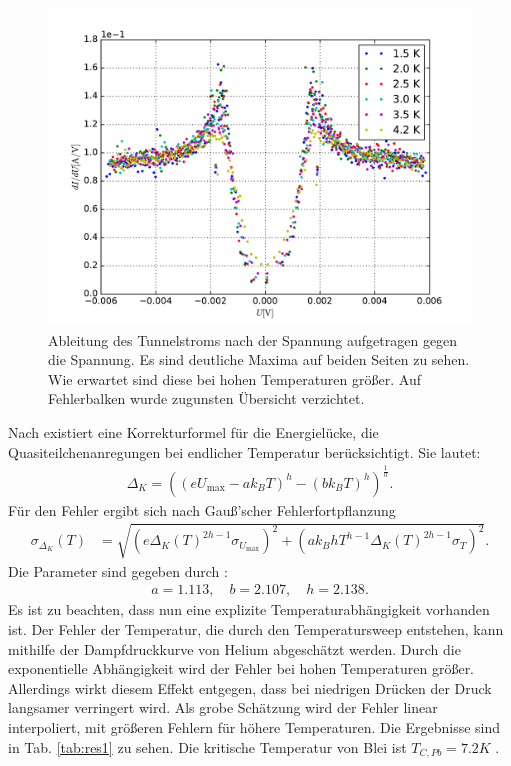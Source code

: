 \documentclass[twoside,        %
               BCOR12mm,       %
               english,ngerman, %
               fleqn,headsepline=false,footsepline=false
              ]{Vorlage/MFPREPORT}
\begin{document}
\begin{figure}[h]
    \centering
    \includegraphics[width=\textwidth]{fig/3.pdf}
    \caption{Ableitung des Tunnelstroms nach der Spannung aufgetragen gegen die
 Spannung. Es sind deutliche Maxima auf beiden Seiten zu sehen. Wie erwartet
 sind diese bei hohen Temperaturen größer. Auf Fehlerbalken wurde zugunsten
 Übersicht verzichtet. }
    \label{fig:3}
\end{figure}
Nach \cite{pike1971} existiert eine Korrekturformel für die Energielücke, die
Quasiteilchenanregungen bei endlicher Temperatur berücksichtigt. Sie lautet:
\begin{align}
    \label{eq:korrektur}
    \Delta_K=\left( \left( eU_{\text{max}}-ak_BT \right)^h-\left( bk_BT
    \right)^h \right)^{\frac{1}{h}}.
\end{align}
Für den Fehler ergibt sich nach Gauß'scher Fehlerfortpflanzung
\begin{align}
    \label{eq:fehlerkorrektur}
    \sigma_{\Delta_{K}}(T)&=\sqrt{(e
    \Delta_{K}(T)^{2h-1}\sigma_{U_{\text{max}}})^2+(ak_BhT^{h-1}
    \Delta_K(T)^{2h-1}\sigma_T)^2}.
\end{align}
Die Parameter sind gegeben durch \cite{pike1971}:
\begin{align}
    a=1.113,\quad b=2.107,\quad h=2.138.
\end{align}
Es ist zu beachten, dass nun eine explizite Temperaturabhängigkeit vorhanden
ist. Der Fehler der Temperatur, die durch den Temperatursweep entstehen, kann
mithilfe der Dampfdruckkurve von Helium abgeschätzt werden. Durch die
exponentielle Abhängigkeit wird der Fehler bei hohen Temperaturen größer.
Allerdings wirkt diesem Effekt entgegen, dass bei niedrigen Drücken der Druck
langsamer verringert wird. Als
grobe Schätzung wird der Fehler linear interpoliert, mit größeren Fehlern für
höhere Temperaturen. Die Ergebnisse sind
in Tab. \ref{tab:res1} zu sehen.
Die kritische Temperatur von Blei ist $T_{C,Pb}=7.2K$ \cite{fprakt}.
\end{document}
